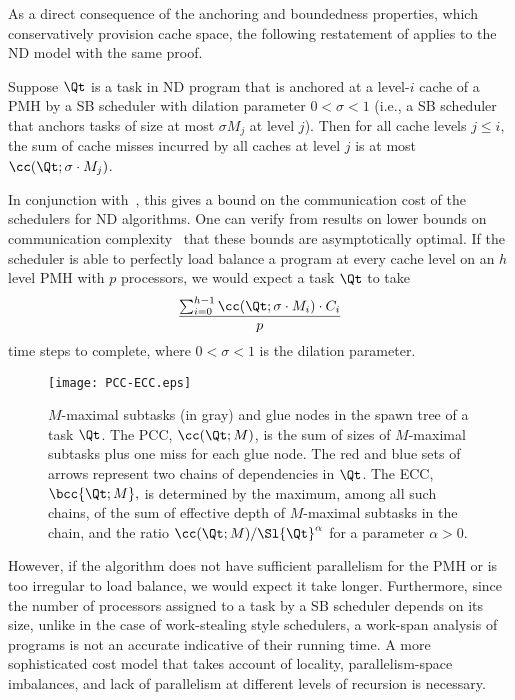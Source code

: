 As a direct consequence of the anchoring and boundedness properties,
which conservatively provision cache space, the following restatement
of \cite[Theorem 3] {BlellochFiGi11} applies to the ND model with the
same proof.
\begin{theorem}
\vspace{-3pt}
Suppose $\Qt$ is a task in ND program that is anchored at a level-$i$
cache of a PMH by a SB scheduler with dilation parameter $0<\sigma<1$
(i.e., a SB scheduler that anchors tasks of size at most $\sigma M_j$
at level $j$). Then for all cache levels $j\leq i$, the sum of
cache misses incurred by all caches at level $j$ is at most
$\cc(\Qt;\sigma\cdot M_j)$.
\end{theorem}

In conjunction with~, this gives a bound on
the communication cost of the schedulers for ND algorithms. One can
verify from results on lower bounds on communication
complexity~\cite{BallardDeHoSc11} that these bounds are asymptotically
optimal.  If the scheduler is able to perfectly load balance a program
at every cache level on an $h$ level PMH with $p$ processors, we would
expect a task $\Qt$ to take
\begin{equation}
\frac{\sum_{i=0}^{h-1} \cc(\Qt;\sigma\cdot M_i)\cdot C_i}{p}
\label{eq:lb}
\end{equation}
time steps to complete, where $0<\sigma<1$ is the dilation parameter.

\begin{figure}[!t]
\texttt{[image: PCC-ECC.eps]}
\vspace{1ex}
\caption{$M$-maximal subtasks (in gray) and glue nodes in the spawn tree 
of a task $\Qt$. The PCC, $\cc(\Qt;M)$, is the sum of sizes of $M$-maximal
subtasks plus one miss for each glue node. The red and blue sets of arrows
represent two chains of dependencies in $\Qt$. The ECC, $\bcc{\Qt;M},$ is
determined by the maximum, among all such chains, of the sum of effective
depth of $M$-maximal subtasks in the chain, and the ratio 
$\cc(\Qt;M)/\Sl{\Qt}^\alpha$ for a parameter $\alpha>0$.
\label{fig:CC}}
\vspace{1ex}
\end{figure}

However, if the algorithm does not have sufficient parallelism for the
PMH or is too irregular to load balance, we would expect it take
longer. Furthermore, since the number of processors assigned to a task
by a SB scheduler depends on its size, unlike in the case of
work-stealing style schedulers, a work-span analysis of programs is
not an accurate indicative of their running time.  A more
sophisticated cost model that takes account of locality,
parallelism-space imbalances, and lack of parallelism at different
levels of recursion is necessary.

